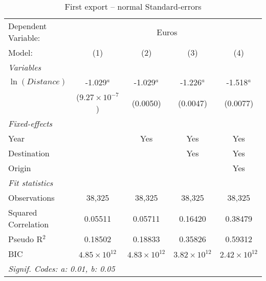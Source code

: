
\begin{table}[htbp]
   \caption{First export -- normal Standard-errors}
   \centering
   \begin{tabular}{lcccc}
      \tabularnewline \midrule \midrule
      Dependent Variable: & \multicolumn{4}{c}{Euros}\\
      Model:              & (1)                     & (2)                   & (3)                   & (4)\\  
      \midrule
      \emph{Variables}\\
      $\ln (Distance)$    & -1.029$^{a}$            & -1.029$^{a}$          & -1.226$^{a}$          & -1.518$^{a}$\\   
                          & ($9.27\times 10^{-7}$)  & (0.0050)              & (0.0047)              & (0.0077)\\   
      \midrule
      \emph{Fixed-effects}\\
      Year                &                         & Yes                   & Yes                   & Yes\\  
      Destination         &                         &                       & Yes                   & Yes\\  
      Origin              &                         &                       &                       & Yes\\  
      \midrule
      \emph{Fit statistics}\\
      Observations        & 38,325                  & 38,325                & 38,325                & 38,325\\  
      Squared Correlation & 0.05511                 & 0.05711               & 0.16420               & 0.38479\\  
      Pseudo R$^2$        & 0.18502                 & 0.18833               & 0.35826               & 0.59312\\  
      BIC                 & $4.85\times 10^{12}$    & $4.83\times 10^{12}$  & $3.82\times 10^{12}$  & $2.42\times 10^{12}$\\   
      \midrule \midrule
      \multicolumn{5}{l}{\emph{Signif. Codes: a: 0.01, b: 0.05}}\\
   \end{tabular}
\end{table}



